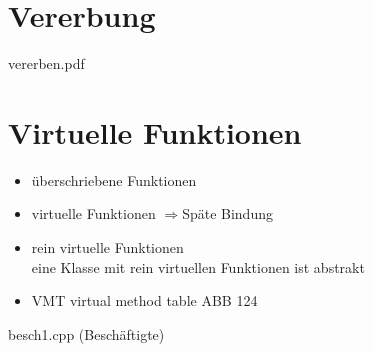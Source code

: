 \section{Vererbung}
vererben.pdf

\section{Virtuelle Funktionen}
\begin{itemize}
\item überschriebene Funktionen 
\item virtuelle Funktionen $\Rightarrow$Späte Bindung
\item rein virtuelle Funktionen\\
eine Klasse mit rein virtuellen Funktionen ist abstrakt
\item VMT virtual method table ABB 124
\end{itemize}
besch1.cpp (Beschäftigte)
